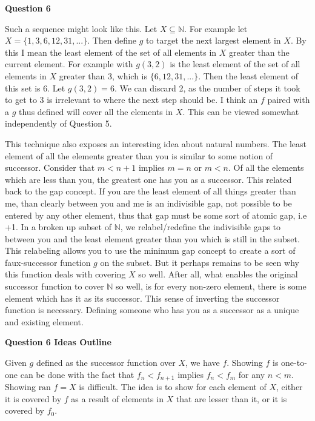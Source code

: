 \documentclass{article}
\begin{document}
\begin{enumerate}
\medskip
\textbf{Question 6}
\medskip

Such a sequence might look like this. Let $X \subseteq \mathbb{N}$. For example let $X = \{1,3,6,12,31,...\}$. Then define $g$ to target the next largest element in $X$. By this I mean the least element of the set of all elements in $X$ greater than the current element. For example with $g(3, 2)$ is the least element of the set of all elements in $X$ greater than 3, which is $\{6,12,31,...\}$. Then the least element of this set is 6. Let $g(3,2) = 6$. We can discard 2, as the number of steps it took to get to 3 is irrelevant to where the next step should be. I think an $f$ paired with a $g$ thus defined will cover all the elements in $X$. This can be viewed somewhat independently of Question 5. 

\medskip
This technique also exposes an interesting idea about natural numbers. The least element of all the elements greater than you is similar to some notion of successor. Consider that $m < n + 1$ implies $m = n$ or $m < n$. Of all the elements which are less than you, the greatest one has you as a successor. This related back to the gap concept. If you are the least element of all things greater than me, than clearly between you and me is an indivisible gap, not possible to be entered by any other element, thus that gap must be some sort of atomic gap, i.e +1. In a broken up subset of $\mathbb{N}$, we relabel/redefine the indivisible gaps to between you and the least element greater than you which is still in the subset. This relabeling allows you to use the minimum gap concept to create a sort of faux-successor function $g$ on the subset. But it perhaps remains to be seen why this function deals with covering $X$ so well. After all, what enables the original successor function to cover $\mathbb{N}$ so well, is for every non-zero element, there is some element which has it as its successor. This sense of inverting the successor function is necessary. Defining someone who has you as a successor as a unique and existing element.

\medskip
\textbf{Question 6 Ideas Outline}
\medskip

Given $g$ defined as the successor function over $X$, we have $f$. Showing $f$ is one-to-one can be done with the fact that $f_n < f_{n + 1}$ implies $f_n < f_m$ for any $n < m$. Showing $\text{ran } f = X$ is difficult. The idea is to show for each element of $X$, either it is covered by $f$ as a result of elements in $X$ that are lesser than it, or it is covered by $f_0$. 


\end{enumerate}
\end{document}
